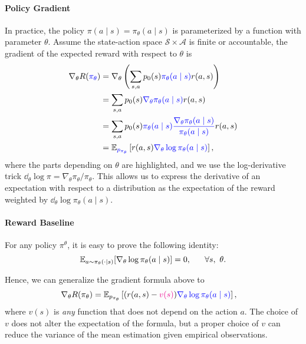 \documentclass[11pt,letterpaper]{article}
\begin{document}
\paragraph{Policy Gradient} 
In practice, the policy $\pi(a \mid s) = \pi_\theta(a \mid s)$ is parameterized by a function with parameter $\theta$. 
Assume the state-action space $\mathcal S \times \mathcal A$ is finite or accountable,
the gradient of the expected reward with  respect to $\theta$ is 
\begin{align} 
\nabla_\theta R(\textcolor{blue}{\pi_\theta}) 
& =  \nabla_\theta \left ( \sum_{s,a} p_0(s) \textcolor{blue}{\pi_\theta(a \mid s)} r(a, s)  \right ) \notag \\
& = \sum_{s,a} p_0(s) \textcolor{blue}{\nabla_\theta \pi_\theta(a \mid s)} r(a, s)  \notag \\ 
& = \sum_{s,a} p_0(s) \textcolor{blue}{\pi_\theta(a \mid s)}\textcolor{blue}{ \frac{ \nabla_\theta \pi_\theta(a \mid s) }{\pi_\theta(a \mid s)} } r(a, s) \notag \\
& = \mathbb{E}_{\textcolor{blue}{p_{\pi_\theta}}} \left[ r(a, s) \textcolor{blue}{\nabla_\theta \log \pi_\theta(a \mid s)} \right], \notag 
\end{align}
where the parts depending on $\theta$ are highlighted, and we use the log-derivative trick $\dd_\theta \log \pi = \nabla_\theta \pi_\theta / \pi_\theta$. This allows us to express the derivative of an expectation with respect to a distribution as the expectation of the reward weighted by $\dd_\theta \log \pi_\theta(a \mid s)$.


\paragraph{Reward Baseline}
 For any policy $\pi^\theta$, it is easy to prove the following identity: 
 $$
 \mathbb{E}_{a\sim \pi_\theta(\cdot|s)}[\nabla_\theta \log \pi_\theta(a\mid s)] =0,~~~~~ \forall s,~\theta.  
 $$
 
Hence, we can generalize the gradient formula above to 
\begin{align} \label{equ:pcgrad2}
\nabla_\theta  R(\pi_\theta ) 
& = \mathbb{E}_{p_{\pi_\theta}}  \left [  (r(a,s) - \textcolor{magenta}{v(s)})  \textcolor{blue}{\nabla_\theta  \log  \pi_\theta (a\mid s)}  \right ],
\end{align}
where $v(s)$ is \emph{any} function that does not depend on the action $a$. 
The choice of $v$ does not alter the expectation of the formula, but a proper choice of $v$ can reduce the variance of the mean estimation given empirical observations. 
\end{document}
